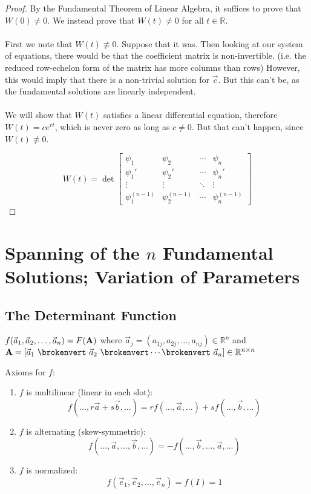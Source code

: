 \documentclass[12pt]{article}
\begin{document}
\begin{proof}
By the Fundamental Theorem of Linear Algebra, it suffices to prove that $W(0) \neq 0$. We instead prove that $W(t) \neq 0$ for all $t \in \mathbb{R}$. \\ \\
First we note that $W(t) \not \equiv 0$. Suppose that it was. Then looking at our system of equations, there would be that the coefficient matrix is non-invertible. (i.e. the reduced row-echelon form of the matrix has more columns than rows) However, this would imply that there is a non-trivial solution for $\vec{c}$. But this can't be, as the fundamental solutions are linearly independent. \\ \\

We will show that $W(t)$ satisfies a linear differential equation, therefore $W(t) = ce^{rt}$, which is never zero as long as $c \neq 0$. But that can't happen, since $W(t) \not \equiv 0$.

\[ W(t) = \det 
\begin{bmatrix}
\psi_1 & \psi_2 & \cdots & \psi_n \\
\psi_1' & \psi_2' & \cdots & \psi_n' \\
\vdots & \vdots & \ddots & \vdots \\
\psi_1^{(n-1)} & \psi_2^{(n-1)} & \cdots & \psi_n^{(n-1)} 
\end{bmatrix}
\]


\end{proof}

\section{Spanning of the $n$ Fundamental Solutions; Variation of Parameters}

\subsection{The Determinant Function}
$f(\vec{a}_1,\vec{a}_2,\dots,\vec{a}_n) = F({\bf A})$ where $\vec{a}_j = (a_{1j}, a_{2j}, \dots, a_{nj}) \in \mathbb{R}^n$ and ${\bf A} = [\vec{a}_1 \ \brokenvert \ \vec{a}_2 \ \brokenvert \cdots \brokenvert \ \vec{a}_n] \in \mathbb{R}^{n\times n}$

Axioms for $f$:
\begin{enumerate}
\item $f$ is multilinear (linear in each slot): \[ f(\dots,r\vec{a}+s\vec{b},\dots) = rf(\dots,\vec{a},\dots) + sf(\dots,\vec{b},\dots) \]
\item $f$ is alternating (skew-symmetric): \[ f(\dots,\vec{a},\dots,\vec{b},\dots) = -f(\dots,\vec{b},\dots,\vec{a},\dots) \]
\item $f$ is normalized: \[ f(\vec{e}_1,\vec{e}_2,\dots,\vec{e}_n) = f(I) = 1 \]
\end{enumerate}
\end{document}
